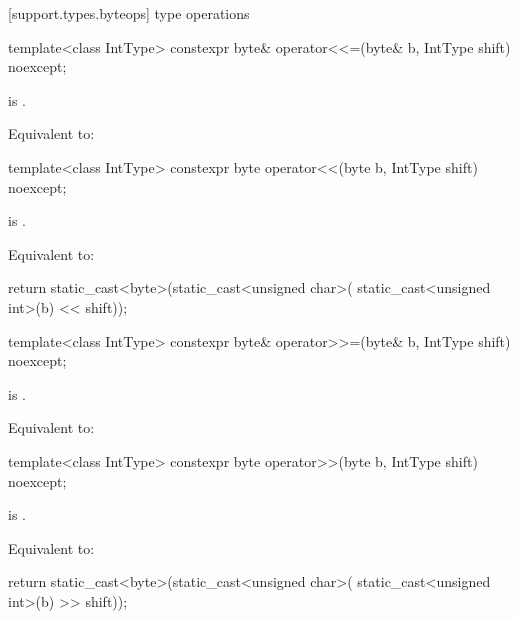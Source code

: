 
[support.types.byteops]{ type operations}

%
\begin{itemdecl}
template<class IntType>
  constexpr byte& operator<<=(byte& b, IntType shift) noexcept;
\end{itemdecl}

\begin{itemdescr}
\pnum \constraints {} is .

\pnum \effects Equivalent to:
\end{itemdescr}

%
\begin{itemdecl}
template<class IntType>
  constexpr byte operator<<(byte b, IntType shift) noexcept;
\end{itemdecl}

\begin{itemdescr}
\pnum \constraints {} is .

\pnum \effects Equivalent to:
\begin{codeblock}
return static_cast<byte>(static_cast<unsigned char>(
	                   static_cast<unsigned int>(b) << shift));
\end{codeblock}
\end{itemdescr}

%
\begin{itemdecl}
template<class IntType>
  constexpr byte& operator>>=(byte& b, IntType shift) noexcept;
\end{itemdecl}

\begin{itemdescr}
\pnum \constraints {} is .

\pnum \effects Equivalent to:
\end{itemdescr}

%
\begin{itemdecl}
template<class IntType>
  constexpr byte operator>>(byte b, IntType shift) noexcept;
\end{itemdecl}

\begin{itemdescr}
\pnum \constraints {} is .

\pnum \effects Equivalent to:
\begin{codeblock}
return static_cast<byte>(static_cast<unsigned char>(
	                   static_cast<unsigned int>(b) >> shift));
\end{codeblock}
\end{itemdescr}

